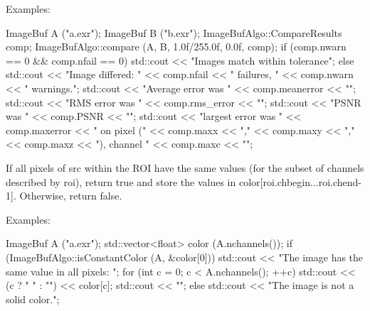 \smallskip
\noindent Examples:
\begin{code}
    ImageBuf A ("a.exr");
    ImageBuf B ("b.exr");
    ImageBufAlgo::CompareResults comp;
    ImageBufAlgo::compare (A, B, 1.0f/255.0f, 0.0f, comp);
    if (comp.nwarn == 0 && comp.nfail == 0) {
        std::cout << "Images match within tolerance\n";
    } else {
        std::cout << "Image differed: " << comp.nfail << " failures, "
                  << comp.nwarn << " warnings.\n";
        std::cout << "Average error was " << comp.meanerror << "\n";
        std::cout << "RMS error was " << comp.rms_error << "\n";
        std::cout << "PSNR was " << comp.PSNR << "\n";
        std::cout << "largest error was " << comp.maxerror 
                  << " on pixel (" << comp.maxx << "," << comp.maxy 
                  << "," << comp.maxz << "), channel " << comp.maxc << "\n";
    }
\end{code}
\apiend

 

If all pixels of {\cf src} within the ROI have the same values (for the
subset of channels described by {\cf roi}), return {\cf true} and store
the values in {\cf color[roi.chbegin...roi.chend-1]}.  Otherwise, return
{\cf false}.

\smallskip
\noindent Examples:
\begin{code}
    ImageBuf A ("a.exr");
    std::vector<float> color (A.nchannels());
    if (ImageBufAlgo::isConstantColor (A, &color[0])) {
        std::cout << "The image has the same value in all pixels: ";
        for (int c = 0;  c < A.nchannels();  ++c)
            std::cout << (c ? " " : "") << color[c];
        std::cout << "\n";
    } else {
        std::cout << "The image is not a solid color.\n";
    }
\end{code}
\apiend


